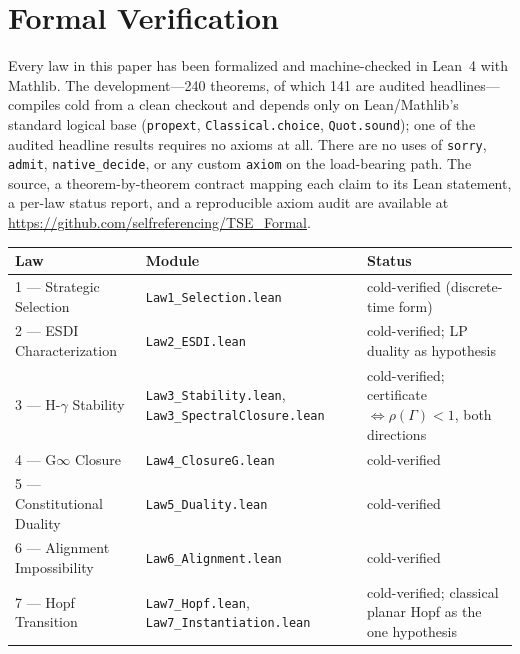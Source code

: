 \documentclass[12pt]{article}
\begin{document}

\section{Formal Verification}
\label{sec:formal-verification}

Every law in this paper has been formalized and machine-checked in Lean~4 with Mathlib. The development---240 theorems, of which 141 are audited headlines---compiles cold from a clean checkout and depends only on Lean/Mathlib's standard logical base (\texttt{propext}, \texttt{Classical.choice}, \texttt{Quot.sound}); one of the audited headline results requires no axioms at all. There are no uses of \texttt{sorry}, \texttt{admit}, \texttt{native\_decide}, or any custom \texttt{axiom} on the load-bearing path. The source, a theorem-by-theorem contract mapping each claim to its Lean statement, a per-law status report, and a reproducible axiom audit are available at \url{https://github.com/selfreferencing/TSE_Formal}.

\begin{center}
\begin{tabular}{@{}lll@{}}
\toprule
Law & Module & Status \\
\midrule
1 --- Strategic Selection & \texttt{Law1\_Selection.lean} & cold-verified (discrete-time form) \\
2 --- ESDI Characterization & \texttt{Law2\_ESDI.lean} & cold-verified; LP duality as hypothesis \\
3 --- H-$\gamma$ Stability & \texttt{Law3\_Stability.lean}, \texttt{Law3\_SpectralClosure.lean} & cold-verified; certificate $\Leftrightarrow \rho(\Gamma) < 1$, both directions \\
4 --- G$\infty$ Closure & \texttt{Law4\_ClosureG.lean} & cold-verified \\
5 --- Constitutional Duality & \texttt{Law5\_Duality.lean} & cold-verified \\
6 --- Alignment Impossibility & \texttt{Law6\_Alignment.lean} & cold-verified \\
7 --- Hopf Transition & \texttt{Law7\_Hopf.lean}, \texttt{Law7\_Instantiation.lean} & cold-verified; classical planar Hopf as the one hypothesis \\
\bottomrule
\end{tabular}
\end{center}
\end{document}
